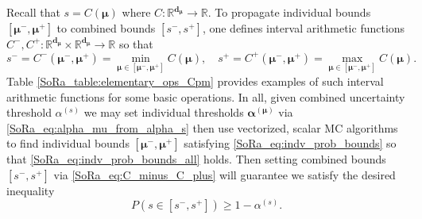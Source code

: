 \documentclass[graybox]{svmult}
\begin{document}
Recall that $s = C(\boldsymbol{\mu})$ where $C: \mathbb{R}^{\boldsymbol{d}_{\boldsymbol{\mu}}} \to \mathbb{R}$. To propagate individual bounds $[\boldsymbol{\mu}^-,\boldsymbol{\mu}^+]$ to combined bounds $[s^-,s^+]$, one defines interval arithmetic \cite{interval_analysis} functions $C^-,C^+: \mathbb{R}^{\boldsymbol{d}_{\boldsymbol{\mu}}} \times \mathbb{R}^{\boldsymbol{d}_{\boldsymbol{\mu}}} \to \mathbb{R}$ so that
\begin{equation}
    s^- = C^-(\boldsymbol{\mu}^-,\boldsymbol{\mu}^+) = \min_{\boldsymbol{\mu} \in [\boldsymbol{\mu}^-,\boldsymbol{\mu}^+]} C(\boldsymbol{\mu}), \quad 
    s^+= C^+(\boldsymbol{\mu}^-,\boldsymbol{\mu}^+) = \max_{\boldsymbol{\mu} \in [\boldsymbol{\mu}^-,\boldsymbol{\mu}^+]} C(\boldsymbol{\mu}).
    \label{SoRa_eq:C_minus_C_plus}
\end{equation}
Table \ref{SoRa_table:elementary_ops_Cpm} provides examples of such interval arithmetic functions for some basic operations. In all, given combined uncertainty threshold $\alpha^{(s)}$ we may set individual thresholds $\boldsymbol{\alpha}^{(\boldsymbol{\mu})}$ via \eqref{SoRa_eq:alpha_mu_from_alpha_s} then use vectorized, scalar MC algorithms to find individual bounds $[\boldsymbol{\mu}^-,\boldsymbol{\mu}^+]$ satisfying \eqref{SoRa_eq:indv_prob_bounds} so that \eqref{SoRa_eq:indv_prob_bounds_all} holds. Then setting combined bounds $[s^-,s^+]$ via \eqref{SoRa_eq:C_minus_C_plus} will guarantee we satisfy the desired inequality 
$$P(s \in [s^-,s^+]) \geq 1-\alpha^{(s)}.$$
\end{document}
